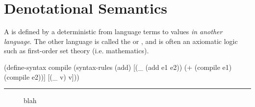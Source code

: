 \section{Denotational Semantics}

A  is defined by a deterministic  from language terms to values \emph{in another language}.
The other language is called the  or , and is often an axiomatic logic such as first-order set theory (i.e. mathematics).

\newsavebox{\compileonebox}

\begin{lrbox}{\compileonebox}
\begin{varwidth}[b]{3.3in}
\singlespacing\centering
\begin{schemedisplay}
(define-syntax compile
  (syntax-rules (add)
    [(_ (add e1 e2))  (+ (compile e1)
                         (compile e2))]
    [(_ v)  v]))
\end{schemedisplay}
\hrule
\end{varwidth}
\end{lrbox}

\begin{figure*}[tb]\centering
{}
\tab\tab
\subfloat[blah]{
\label{fig:add-denotational:implementation}
\usebox{\compileonebox}
}
\caption[ ]{blah}
\label{fig:add-denotational}
\end{figure*}

